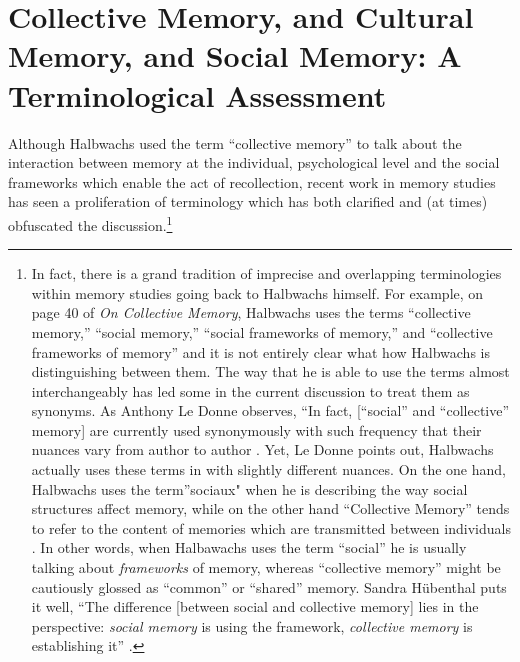 \hypertarget{collective-memory-and-cultural-memory-and-social-memory-a-terminological-assessment}{%
\section{Collective Memory, and Cultural Memory, and Social Memory: A
Terminological
Assessment}\label{collective-memory-and-cultural-memory-and-social-memory-a-terminological-assessment}}

Although Halbwachs used the term ``collective memory'' to talk about the
interaction between memory at the individual, psychological level and
the social frameworks which enable the act of recollection, recent work
in memory studies has seen a proliferation of terminology which has both
clarified and (at times) obfuscated the discussion.\footnote{In fact,
  there is a grand tradition of imprecise and overlapping terminologies
  within memory studies going back to Halbwachs himself. For example, on
  page 40 of \emph{On Collective Memory}, Halbwachs uses the terms
  ``collective memory,'' ``social memory,'' ``social frameworks of
  memory,'' and ``collective frameworks of memory'' and it is not
  entirely clear what how Halbwachs is distinguishing between them. The
  way that he is able to use the terms almost interchangeably has led
  some in the current discussion to treat them as synonyms. As Anthony
  Le Donne observes, ``In fact, {[}``social'' and ``collective''
  memory{]} are currently used synonymously with such frequency that
  their nuances vary from author to author \autocite[42
  n.8]{ledonne2009}. Yet, Le Donne points out, Halbwachs actually uses
  these terms in with slightly different nuances. On the one hand,
  Halbwachs uses the term''sociaux" when he is describing the way social
  structures affect memory, while on the other hand ``Collective
  Memory'' tends to refer to the content of memories which are
  transmitted between individuals \autocite[42 n.8]{ledonne2009}. In
  other words, when Halbawachs uses the term ``social'' he is usually
  talking about \emph{frameworks} of memory, whereas ``collective
  memory'' might be cautiously glossed as ``common'' or ``shared''
  memory. Sandra Hübenthal puts it well, ``The difference {[}between
  social and collective memory{]} lies in the perspective: \emph{social
  memory} is using the framework, \emph{collective memory} is
  establishing it'' \autocite[180]{hubenthal_carstens-hasselbalch2012}.}
